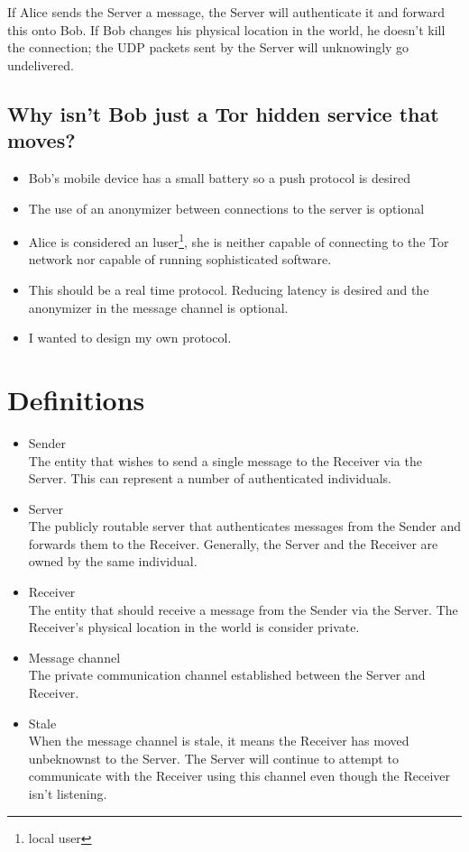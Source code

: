 \documentclass[11pt]{article}
\begin{document}
If Alice sends the Server a message, the Server will authenticate it and
forward this onto Bob. If Bob changes his physical location in the world, he
doesn't kill the connection; the UDP packets sent by the Server will
unknowingly go undelivered.

\subsection*{Why isn't Bob just a Tor hidden service that moves?}
\begin{itemize}
\item Bob's mobile device has a small battery so a push protocol is desired
\item The use of an anonymizer between connections to the server is optional
\item Alice is considered an luser\footnote{local user}, she is neither capable
of connecting to the Tor network nor capable of running sophisticated software.
\item This should be a real time protocol. Reducing latency is desired and the
anonymizer in the message channel is optional.
\item I wanted to design my own protocol.
\end{itemize}

\pagebreak
\section*{Definitions}
\begin{itemize}
\item Sender \\
The entity that wishes to send a single message to the Receiver via the Server.
This can represent a number of authenticated individuals.
\item Server \\
The publicly routable server that authenticates messages from the Sender and
forwards them to the Receiver. Generally, the Server and the Receiver are
owned by the same individual.
\item Receiver \\
The entity that should receive a message from the Sender via the Server. The
Receiver's physical location in the world is consider private.
\item Message channel \\
The private communication channel established between the Server and Receiver.
\item Stale \\
When the message channel is stale, it means the Receiver has moved unbeknownst
to the Server. The Server will continue to attempt to communicate with the
Receiver using this channel even though the Receiver isn't listening.
\end{itemize}
\pagebreak
\end{document}
